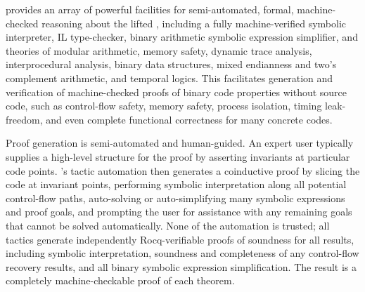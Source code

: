 
\Picinae{} provides an array of powerful facilities for semi-automated, formal, machine-checked reasoning about the lifted \IL, including a fully machine-verified symbolic interpreter, IL type-checker, binary arithmetic symbolic expression simplifier, and theories of modular arithmetic, memory safety, dynamic trace analysis, interprocedural analysis, binary data structures, mixed endianness and two's complement arithmetic, and temporal logics.
This facilitates generation and verification of machine-checked proofs of binary code properties without source code, such as control-flow safety, memory safety, process isolation, timing leak-freedom, and even complete functional correctness for many concrete codes.

Proof generation is semi-automated and human-guided.
An expert user typically supplies a high-level structure for the proof by asserting invariants at particular code points.
\Picinae's tactic automation then generates a coinductive proof by slicing the code at invariant points, performing symbolic interpretation along all potential control-flow paths, auto-solving or auto-simplifying many symbolic expressions and proof goals, and prompting the user for assistance with any remaining goals that cannot be solved automatically.
None of the automation is trusted; all tactics generate independently Rocq-verifiable proofs of soundness for all results, including symbolic interpretation, soundness and completeness of any control-flow recovery results, and all binary symbolic expression simplification.
The result is a completely machine-checkable proof of each theorem.

